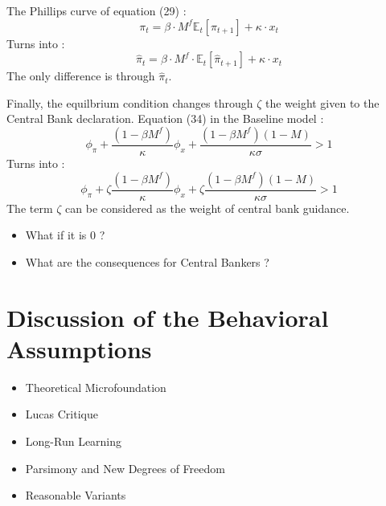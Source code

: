 \documentclass{beamer}
\newcommand\ReduceFont{\fontsize{10}{7.2}\selectfont}
\begin{document}
\begin{frame}{\subsecname}
    The Phillips curve of equation (29) :
    \begin{equation}\tag{29}
        \pi_{t}=\beta\cdot M^{f} \mathbb{E}_{t}\left[\pi_{t+1}\right]+\kappa\cdot x_{t}
    \end{equation}
    Turns into :
    \begin{equation}\tag{61}
        \hat{\pi}_{t}=\beta\cdot M^{f}\cdot\mathbb{E}_t\left[\hat{\pi}_{t+1}\right]+\kappa\cdot x_{t}
    \end{equation}
    The only difference is through $\hat{\pi}_{t}$.
\end{frame}

\begin{frame}{\subsecname}
    Finally, the equilbrium condition changes through $\zeta$ the weight given to the Central Bank declaration. 
    Equation (34) in the Baseline model :
    \begin{equation}\tag{34}
        \phi_{\pi}+\frac{(1-\beta M^{f})}{\kappa}\phi_{x}+\frac{(1-\beta M^{f})(1-M)}{\kappa\sigma}>1
    \end{equation}
    Turns into :
    \begin{equation}\tag{62}
        \phi_{\pi}+\zeta \frac{(1-\beta M^{f})}{\kappa}\phi_{x}+\zeta\frac{(1-\beta M^{f})(1-M)}{\kappa \sigma}>1
    \end{equation}
    The term $\zeta$ can be considered as the weight of central bank guidance.
    \begin{itemize}
        \item What if it is 0 ?
        \item What are the consequences for Central Bankers ?
    \end{itemize}
\end{frame}


\section{Discussion of the Behavioral Assumptions}
\begin{frame}
    \ReduceFont
\end{frame}

\begin{frame}
    \begin{itemize}
        \item Theoretical Microfoundation
        \item Lucas Critique
        \item Long-Run Learning
        \item Parsimony and New Degrees of Freedom
        \item Reasonable Variants
    \end{itemize}
\end{frame}
\end{document}
